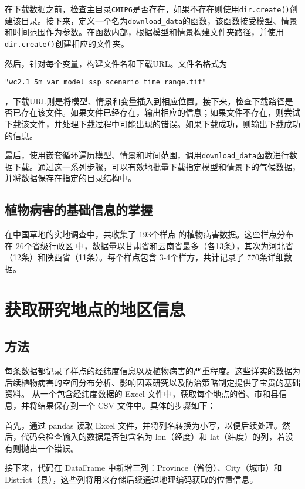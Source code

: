 \documentclass[AutoFakeBold]{LZUThesis-PgD&PhD}
\begin{document}
在下载数据之前，检查主目录\texttt{CMIP6}是否存在，如果不存在则使用\texttt{dir.create()}创建该目录。接下来，定义一个名为\texttt{download\_data}的函数，该函数接受模型、情景和时间范围作为参数。在函数内部，根据模型和情景构建文件夹路径，并使用\texttt{dir.create()}创建相应的文件夹。

然后，针对每个变量，构建文件名和下载URL。文件名格式为
\begin{lstlisting}
"wc2.1_5m_var_model_ssp_scenario_time_range.tif"
\end{lstlisting}
，下载URL则是将模型、情景和变量插入到相应位置。接下来，检查下载路径是否已存在该文件。如果文件已经存在，输出相应的信息；如果文件不存在，则尝试下载该文件，并处理下载过程中可能出现的错误。如果下载成功，则输出下载成功的信息。

最后，使用嵌套循环遍历模型、情景和时间范围，调用\texttt{download\_data}函数进行数据下载。通过这一系列步骤，可以有效地批量下载指定模型和情景下的气候数据，并将数据保存在指定的目录结构中。


\subsection{植物病害的基础信息的掌握}
在中国草地的实地调查中，共收集了 193个样点 的植物病害数据。这些样点分布在 26个省级行政区 中，数据量以甘肃省和云南省最多（各13条），其次为河北省（12条）和陕西省（11条）。每个样点包含 3-4个样方，共计记录了 770条详细数据。



\section{获取研究地点的地区信息}

   \subsection{方法}
每条数据都记录了样点的经纬度信息以及植物病害的严重程度。这些详实的数据为后续植物病害的空间分布分析、影响因素研究以及防治策略制定提供了宝贵的基础资料。
从一个包含经纬度数据的 Excel 文件中，获取每个地点的省、市和县信息，并将结果保存到一个 CSV 文件中。具体的步骤如下：

首先，通过 pandas 读取 Excel 文件，并将列名转换为小写，以便后续处理。然后，代码会检查输入的数据是否包含名为 lon（经度）和 lat（纬度）的列，若没有则抛出一个错误。

接下来，代码在 DataFrame 中新增三列：Province（省份）、City（城市）和 District（县），这些列将用来存储后续通过地理编码获取的位置信息。
\end{document}
